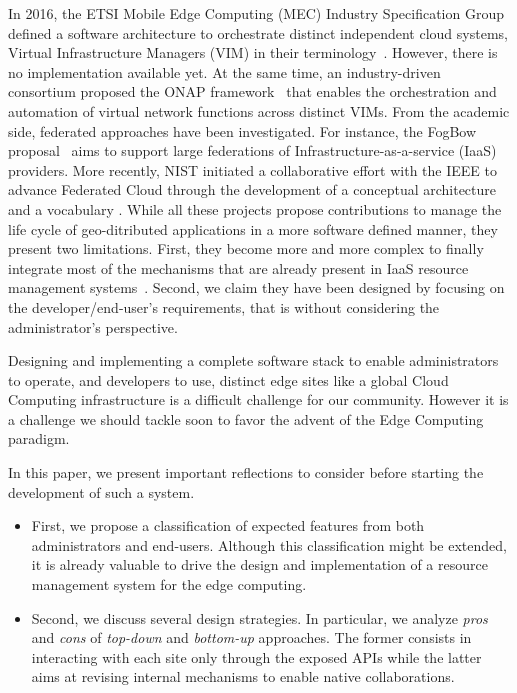 In 2016, the ETSI Mobile Edge Computing (MEC)
Industry Specification Group defined  a software architecture
to orchestrate distinct independent cloud systems, \aka Virtual
Infrastructure Managers (VIM) in their terminology~\cite{7574435}. However, there is no implementation available yet.  At the
same time, an industry-driven consortium proposed
the ONAP framework~\cite{onap} that enables the orchestration and
automation of virtual network functions across distinct VIMs.  From
the academic side, federated approaches have been investigated.
For instance, the FogBow proposal~\cite{brasileiro2016fogbow} aims to
support large federations of Infrastructure-as-a-service (IaaS)
providers. More recently, NIST %
initiated a collaborative effort with the IEEE 
to advance Federated Cloud through the development
of a conceptual architecture and a vocabulary
.
%
While all these projects propose contributions to manage the life cycle of
geo-ditributed applications in a more software defined manner, they present two
limitations. First, they become more and more complex to finally
integrate most of the mechanisms that are already present in
IaaS resource management systems~\cite{moreno2012csp, OpenStackCascading}.  Second,
we claim they have been designed by focusing on the developer/end-user's
requirements, that is without considering the administrator's
perspective.

Designing and implementing a complete software stack to enable
administrators to operate, and developers to use, distinct edge sites
like a global Cloud Computing infrastructure is a difficult challenge
for our community. However it is a challenge we should tackle soon to
favor the advent of the Edge Computing paradigm.

In this paper, we
present important reflections to consider before starting the development of such a system.
\begin{itemize}
\item First, we propose a classification of expected features from
  both administrators and end-users. Although this classification might be extended, it is already valuable to drive the design and implementation of a resource management system for the edge computing.
    \item Second, we discuss several design strategies. In particular, we
  analyze \emph{pros} and \emph{cons} of \emph{top-down} and \emph{bottom-up} approaches. The
  former consists in interacting with each site only through the exposed APIs
  while the latter aims at revising internal mechanisms to enable
  native collaborations.
  \end{itemize}

